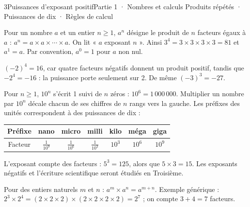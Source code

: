 \begin{ouverture}[calcul]{3}{Puissances d’exposant positif}{Partie 1 · Nombres et calculs}
{Produits répétés · Puissances de dix · Règles de calcul}
\end{ouverture}
\pagestyle{otMain}\essentiel\fontsize{11}{15}\selectfont
{}\label{cours-3-1}
\begin{definition}Pour un nombre $a$ et un entier $n\ge1$, $a^n$ désigne le produit de $n$ facteurs égaux à $a$ : $a^n=a\times a\times\cdots\times a$. On lit « $a$ exposant $n$ ». Ainsi $3^4=3\times3\times3\times3=81$ et $a^1=a$. Par convention, $a^0=1$ pour $a$ non nul.\end{definition}
\begin{exemple}$(-2)^4=16$, car quatre facteurs négatifs donnent un produit positif, tandis que $-2^4=-16$ : la puissance porte seulement sur 2. De même $(-3)^3=-27$.\end{exemple}
\begin{definition}Pour $n\ge1$, $10^n$ s’écrit 1 suivi de $n$ zéros : $10^6=1\,000\,000$. Multiplier un nombre par $10^n$ décale chacun de ses chiffres de $n$ rangs vers la gauche. Les préfixes des unités correspondent à des puissances de dix :\end{definition}
\begin{center}\renewcommand{\arraystretch}{1.35}\begin{tabular}{c|cccccc}\toprule
Préfixe & nano & micro & milli & kilo & méga & giga\\\midrule
Facteur & $\frac1{10^9}$ & $\frac1{10^6}$ & $\frac1{10^3}$ & $10^3$ & $10^6$ & $10^9$\\\bottomrule
\end{tabular}\end{center}
\begin{attention}L’exposant compte des facteurs : $5^3=125$, alors que $5\times3=15$. Les exposants négatifs et l’écriture scientifique seront étudiés en Troisième.\end{attention}
\clearpage
{}\label{cours-3-2}
\begin{propriete}Pour des entiers naturels $m$ et $n$ : $a^m\times a^n=a^{m+n}$. Exemple générique : $2^3\times2^4=(2\times2\times2)\times(2\times2\times2\times2)=2^7$ ; on compte $3+4=7$ facteurs.\end{propriete}
